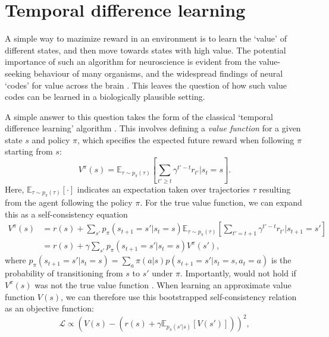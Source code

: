 \section{Temporal difference learning}
\label{sec:temporal_difference}

A simple way to mazimize reward in an environment is to learn the `value' of different states, and then move towards states with high value.
The potential importance of such an algorithm for neuroscience is evident from the value-seeking behaviour of many organisms, and the widespread findings of neural `codes' for value across the brain \citep{rushworth2011frontal}.
This leaves the question of how such value codes can be learned in a biologically plausible setting.

A simple answer to this question takes the form of the classical `temporal difference learning' algorithm \citep{sutton1988learning,sutton2018reinforcement}.
This involves defining a \emph{value function} for a given state $s$ and policy $\pi$, which specifies the expected future reward when following $\pi$ starting from $s$:
\begin{equation}
    \label{eq:V-values}
    V^{\pi}(s) = \mathbb{E}_{\tau \sim p_\pi(\tau)} \left [ \sum_{t' \geq t} \gamma^{t' - t} r_{t'} | s_t = s \right ].
\end{equation}
Here, $\mathbb{E}_{\tau \sim p_\pi(\tau)} [ \cdot ]$ indicates an expectation taken over trajectories $\tau$ resulting from the agent following the policy $\pi$.
For the true value function, we can expand this as a self-consistency equation
\begin{align}
    V^{\pi}(s) &= r(s) + \sum_{s'} p_{\pi}(s_{t+1} = s' | s_t = s) \mathbb{E}_{\tau \sim p_\pi(\tau)} \left [ \sum_{t' = t+1} \gamma^{t' - t} r_{t'} | s_{t+1} = s' \right ] \\
    &=  r(s) + \gamma \sum_{s'} p_{\pi}(s_{t+1} = s' | s_t = s) V^{\pi}(s'),
    \label{eq:value_expansion}
\end{align}
where $p_{\pi}(s_{t+1} = s' | s_t = s) = \sum_a \pi(a|s) p(s_{t+1} = s' | s_t = s, a_t = a)$ is the probability of transitioning from $s$ to $s'$ under $\pi$.
Importantly,  would not hold if $V^{\pi}(s)$ was not the true value function \citep{sutton2018reinforcement}.
%
When learning an approximate value function $V(s)$, we can therefore use this bootstrapped self-consistency relation as an objective function:
\begin{equation}
    \mathcal{L} \propto \left (  V(s) - \left ( r(s) + \gamma \mathbb{E}_{p_\pi(s'|s)} \left [ V(s') \right ] \right ) \right )^2,
\end{equation}
